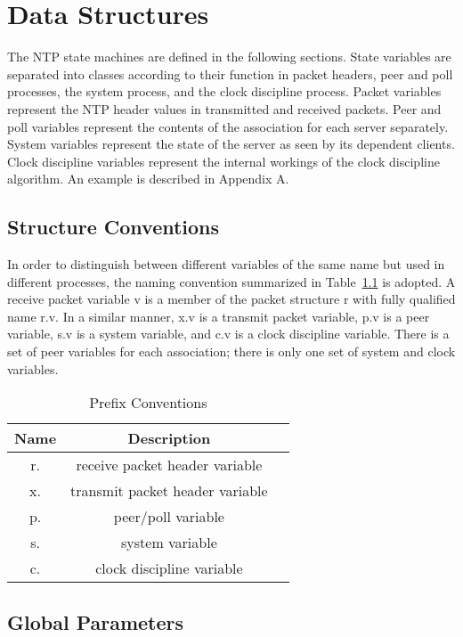 \chapter{Data Structures}
\label{section-7}

The NTP state machines are defined in the following sections. State
variables are separated into classes according to their function in
packet headers, peer and poll processes, the system process, and the
clock discipline process. Packet variables represent the NTP header
values in transmitted and received packets. Peer and poll variables
represent the contents of the association for each server separately.
System variables represent the state of the server as seen by its
dependent clients. Clock discipline variables represent the internal
workings of the clock discipline algorithm. An example is described
in Appendix A.

\section{Structure Conventions}
\label{section-7-1}

In order to distinguish between different variables of the same name
but used in different processes, the naming convention summarized in
Table~\ref{prefix_conventions} is adopted. A receive packet variable v is a member of the
packet structure r with fully qualified name r.v. In a similar
manner, x.v is a transmit packet variable, p.v is a peer variable,
s.v is a system variable, and c.v is a clock discipline variable.
There is a set of peer variables for each association; there is only
one set of system and clock variables.

\begin{table}[htb]
\center
\begin{tabular}{c | c | c}
Name & Description \\
\hline
\hline
r. & receive packet header variable \\
x. & transmit packet header variable \\
p. & peer/poll variable \\
s. & system variable \\
c. & clock discipline variable \\
\hline
\end{tabular}
\label{prefix_conventions}
\caption{Prefix Conventions}
\end{table}

\section{Global Parameters}
\label{section-7-2}

